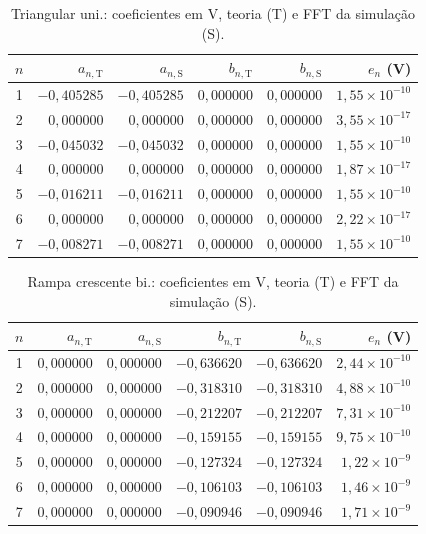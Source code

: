 \begin{table}[H]
\centering
\footnotesize\setlength{\tabcolsep}{2pt}
\caption{Triangular uni.: coeficientes em V, teoria (T) e FFT da simulação (S).}\label{tab:coef_comp3}
\begin{tabular}{crrrrr}\hline
$n$ & $a_{n,\mathrm T}$ & $a_{n,\mathrm S}$ & $b_{n,\mathrm T}$ & $b_{n,\mathrm S}$ & $e_n$ (V) \\ \hline
1 & $-0{,}405285$ & $-0{,}405285$ & $0{,}000000$ & $0{,}000000$ & $1{,}55\!\times\!10^{-10}$ \\
2 & $0{,}000000$ & $0{,}000000$ & $0{,}000000$ & $0{,}000000$ & $3{,}55\!\times\!10^{-17}$ \\
3 & $-0{,}045032$ & $-0{,}045032$ & $0{,}000000$ & $0{,}000000$ & $1{,}55\!\times\!10^{-10}$ \\
4 & $0{,}000000$ & $0{,}000000$ & $0{,}000000$ & $0{,}000000$ & $1{,}87\!\times\!10^{-17}$ \\
5 & $-0{,}016211$ & $-0{,}016211$ & $0{,}000000$ & $0{,}000000$ & $1{,}55\!\times\!10^{-10}$ \\
6 & $0{,}000000$ & $0{,}000000$ & $0{,}000000$ & $0{,}000000$ & $2{,}22\!\times\!10^{-17}$ \\
7 & $-0{,}008271$ & $-0{,}008271$ & $0{,}000000$ & $0{,}000000$ & $1{,}55\!\times\!10^{-10}$ \\
\hline\end{tabular}
\end{table}
\begin{table}[H]
\centering
\footnotesize\setlength{\tabcolsep}{2pt}
\caption{Rampa crescente bi.: coeficientes em V, teoria (T) e FFT da simulação (S).}\label{tab:coef_comp4}
\begin{tabular}{crrrrr}\hline
$n$ & $a_{n,\mathrm T}$ & $a_{n,\mathrm S}$ & $b_{n,\mathrm T}$ & $b_{n,\mathrm S}$ & $e_n$ (V) \\ \hline
1 & $0{,}000000$ & $0{,}000000$ & $-0{,}636620$ & $-0{,}636620$ & $2{,}44\!\times\!10^{-10}$ \\
2 & $0{,}000000$ & $0{,}000000$ & $-0{,}318310$ & $-0{,}318310$ & $4{,}88\!\times\!10^{-10}$ \\
3 & $0{,}000000$ & $0{,}000000$ & $-0{,}212207$ & $-0{,}212207$ & $7{,}31\!\times\!10^{-10}$ \\
4 & $0{,}000000$ & $0{,}000000$ & $-0{,}159155$ & $-0{,}159155$ & $9{,}75\!\times\!10^{-10}$ \\
5 & $0{,}000000$ & $0{,}000000$ & $-0{,}127324$ & $-0{,}127324$ & $1{,}22\!\times\!10^{-9}$ \\
6 & $0{,}000000$ & $0{,}000000$ & $-0{,}106103$ & $-0{,}106103$ & $1{,}46\!\times\!10^{-9}$ \\
7 & $0{,}000000$ & $0{,}000000$ & $-0{,}090946$ & $-0{,}090946$ & $1{,}71\!\times\!10^{-9}$ \\
\hline\end{tabular}
\end{table}
